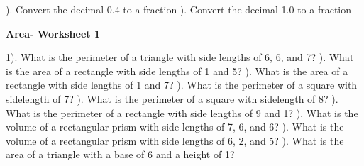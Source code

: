 \documentclass{article}%
\begin{document}
). Convert the decimal 0.4 to a fraction%
\newline%
\newline%
). Convert the decimal 1.0 to a fraction%
\newline%
\newline%
\newline%
\pagebreak%
\large%
\begin{center}%
\textbf{Area- Worksheet 1}%
\newline%
\end{center} \normalsize%
1). What is the perimeter of a triangle with side lengths of 6, 6, and 7?%
\newline%
\newline%
). What is the area of a rectangle with side lengths of 1 and 5?%
\newline%
\newline%
). What is the area of a rectangle with side lengths of 1 and 7?%
\newline%
\newline%
). What is the perimeter of a square with sidelength of 7?%
\newline%
\newline%
). What is the perimeter of a square with sidelength of 8?%
\newline%
\newline%
). What is the perimeter of a rectangle with side lengths of 9 and 1?%
\newline%
\newline%
). What is the volume of a rectangular prism with side lengths of 7, 6, and 6?%
\newline%
\newline%
). What is the volume of a rectangular prism with side lengths of 6, 2, and 5?%
\newline%
\newline%
). What is the area of a triangle with a base of 6 and a height of 1?%
\newline%
\newline%
\newline%
\end{document}
